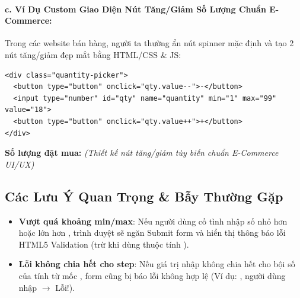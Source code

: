 \paragraph{c. Ví Dụ Custom Giao Diện Nút Tăng/Giảm Số Lượng Chuẩn E-Commerce:}
Trong các website bán hàng, người ta thường ẩn nút spinner mặc định và tạo 2 nút tăng/giảm đẹp mắt bằng HTML/CSS \& JS:

\begin{codeWindow}
\begin{lstlisting}[language=HTML5]
<div class="quantity-picker">
  <button type="button" onclick="qty.value--">-</button>
  <input type="number" id="qty" name="quantity" min="1" max="99" value="18">
  <button type="button" onclick="qty.value++">+</button>
</div>
\end{lstlisting}
\end{codeWindow}

\begin{browserWindow}
\sffamily\small
\textbf{Số lượng đặt mua:} \quad
{} \qquad \textcolor{codeComment}{\small\textit{(Thiết kế nút tăng/giảm tùy biến chuẩn E-Commerce UI/UX)}}
\end{browserWindow}

\subsection{Các Lưu Ý Quan Trọng \& Bẫy Thường Gặp}

\begin{warnBox}
\begin{itemize}[leftmargin=1.5em, itemsep=2pt, parsep=0pt]
    \item \textbf{Vượt quá khoảng min/max}: Nếu người dùng cố tình nhập số nhỏ hơn  hoặc lớn hơn , trình duyệt sẽ ngăn Submit form và hiển thị thông báo lỗi HTML5 Validation (trừ khi dùng thuộc tính ).
    \item \textbf{Lỗi không chia hết cho step}: Nếu giá trị nhập không chia hết cho bội số của  tính từ mốc , form cũng bị báo lỗi không hợp lệ (Ví dụ: , người dùng nhập  $\rightarrow$ Lỗi!).
\end{itemize}
\end{warnBox}

